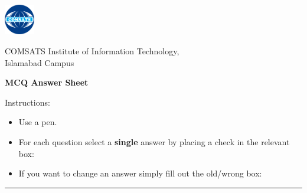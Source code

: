 \documentclass[english,a4paper,oneside]{sdaps}
\author{}
\title{}
\begin{document}

    \hspace{7em}\includegraphics[width=0.1\textwidth]{comsats-logo}         %
    \vspace{-5\baselineskip}                                    %

    \begin{center}
           {COMSATS Institute of Information Technology,\\
           Islamabad Campus}

           \vspace{\baselineskip}
           {\LARGE \bfseries MCQ Answer Sheet}\\

    \end{center}

    Instructions:

        \vspace{.5\baselineskip}
        \hspace{0.025\linewidth}\begin{minipage}{0.9\linewidth}%
            \begin{itemize}
                \item Use a pen.
                \item For each question select a \textbf{single} answer by placing a check in the relevant box: \hspace{1em}\checkedbox
                \item If you want to change an answer simply fill out the old/wrong box: \hspace{1em}\correctedbox
            \end{itemize}
        \end{minipage}

    \vspace{-0.5\baselineskip}
    \begin{center}\rule{0.8\linewidth}{0.5pt}\end{center}
    \vspace{\baselineskip}
\end{document}

